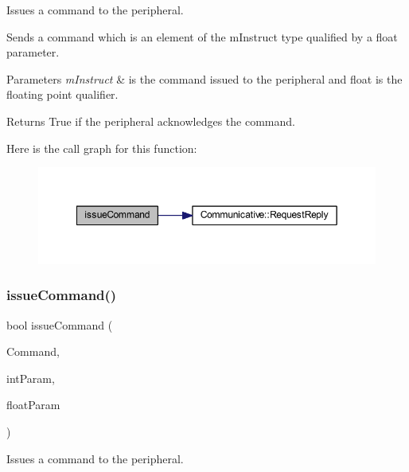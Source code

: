 Issues a command to the peripheral. 

Sends a command which is an element of the m\+Instruct type qualified by a float parameter. 
\begin{DoxyParams}{Parameters}
{\em m\+Instruct} & is the command issued to the peripheral and float is the floating point qualifier. \\
\hline
\end{DoxyParams}
\begin{DoxyReturn}{Returns}
True if the peripheral acknowledges the command. 
\end{DoxyReturn}
Here is the call graph for this function\+:
\nopagebreak
\begin{figure}[H]
\begin{center}
\leavevmode
\includegraphics[width=349pt]{class_instructable_a556e6313ec5ac21a30efe8a5ef28a486_cgraph}
\end{center}
\end{figure}
\mbox{\label{class_instructable_ac2d69c105880162fed7b7be07228cfa7}} 
\subsubsection{\texorpdfstring{issueCommand()}{issueCommand()}\hspace{0.1cm}{\footnotesize\ttfamily [4/4]}}
{\footnotesize\ttfamily bool issue\+Command (\begin{DoxyParamCaption}\item[{\mbox{\hyperlink{_s_p_i___instruction_set_8h_afefab269eb3692ecb3e5fcdbb9440792}{m\+Instruct}}}]{Command,  }\item[{int}]{int\+Param,  }\item[{float}]{float\+Param }\end{DoxyParamCaption})}



Issues a command to the peripheral. 

